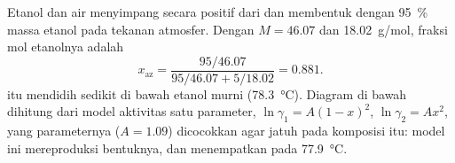 \begin{example}\label{ex:b2:liquid-vapour-diagrams:ethanol-water}
Etanol dan air menyimpang secara positif dari  dan membentuk
 dengan 95~\% massa etanol pada tekanan atmosfer. Dengan
$M = 46.07$ dan \qty{18.02}{g/mol}, fraksi mol etanolnya adalah
\[
  x_{\text{az}} = \frac{95/46.07}{95/46.07 + 5/18.02} = 0.881 .
\]
 itu mendidih sedikit di bawah etanol murni
(\qty{78.3}{\degreeCelsius}). Diagram di bawah dihitung dari model
aktivitas satu parameter, $\ln\gamma_1 = A(1 -
x)^2$, $\ln\gamma_2 = Ax^2$,
yang parameternya ($A = 1.09$) dicocokkan agar  jatuh pada
komposisi itu: model ini mereproduksi bentuknya, dan menempatkan 
pada \qty{77.9}{\degreeCelsius}.
\end{example}

